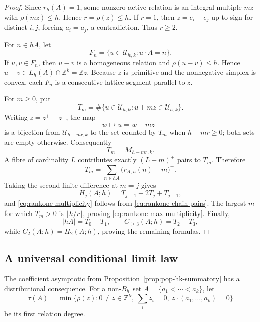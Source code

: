 \documentclass[11pt,reqno]{amsart}
\theoremstyle{definition}
\theoremstyle{remark}
\begin{document}
\begin{proof}
Since $r_h(A)=1$, some nonzero active relation is an integral multiple
$mz$ with $\rho(mz)\leq h$.  Hence $r=\rho(z)\leq h$.  If $r=1$, then
$z=e_i-e_j$ up to sign for distinct $i,j$, forcing $a_i=a_j$, a
contradiction.  Thus $r\geq2$.

For $n\in hA$, let
\[
 F_n=\{u\in\mathcal U_{h,k}:u\cdot A=n\}.
\]
If $u,v\in F_n$, then $u-v$ is a homogeneous relation and
$\rho(u-v)\leq h$.  Hence $u-v\in L_h(A)\cap\mathbb Z^k=\mathbb Zz$.
Because $z$ is primitive and the nonnegative simplex is convex, each
$F_n$ is a consecutive lattice segment parallel to $z$.

For $m\geq0$, put
\[
 T_m
 =
 \#\{u\in\mathcal U_{h,k}:u+mz\in\mathcal U_{h,k}\}.
\]
Writing $z=z^+-z^-$, the map
\[
 w\longmapsto u=w+mz^-
\]
is a bijection from $\mathcal U_{h-mr,k}$ to the set counted by $T_m$
when $h-mr\geq0$; both sets are empty otherwise.  Consequently
\begin{equation}\label{eq:rankone-chain-pairs}
 T_m=M_{h-mr,k}.
\end{equation}
A fibre of cardinality $L$ contributes exactly $(L-m)^+$ pairs to
$T_m$.  Therefore
\[
 T_m=\sum_{n\in hA}\bigl(r_{A,h}(n)-m\bigr)^+.
\]
Taking the second finite difference at $m=j$ gives
\[
 H_j(A;h)=T_{j-1}-2T_j+T_{j+1},
\]
and \eqref{eq:rankone-multiplicity} follows from
\eqref{eq:rankone-chain-pairs}.  The largest $m$ for which $T_m>0$ is
$\lfloor h/r\rfloor$, proving \eqref{eq:rankone-max-multiplicity}.
Finally,
\[
 |hA|=T_0-T_1,
 \qquad
 C_{\geq3}(A;h)=T_2-T_3,
\]
while $C_2(A;h)=H_2(A;h)$, proving the remaining formulas.
\end{proof}

\subsection{A universal conditional limit law}
\label{subsec:conditional-limit}

The coefficient asymptotic from Proposition~\ref{prop:pop-hk-summatory}
has a distributional consequence.  For a non-$B_h$ set
$A=\{a_1<\cdots<a_k\}$, let
\[
 \tau(A)=\min\{\rho(z):0\ne z\in\mathbb Z^k,
                  \ \sum_i z_i=0,\ z\cdot(a_1,\ldots,a_k)=0\}
\]
be its first relation degree.
\end{document}
